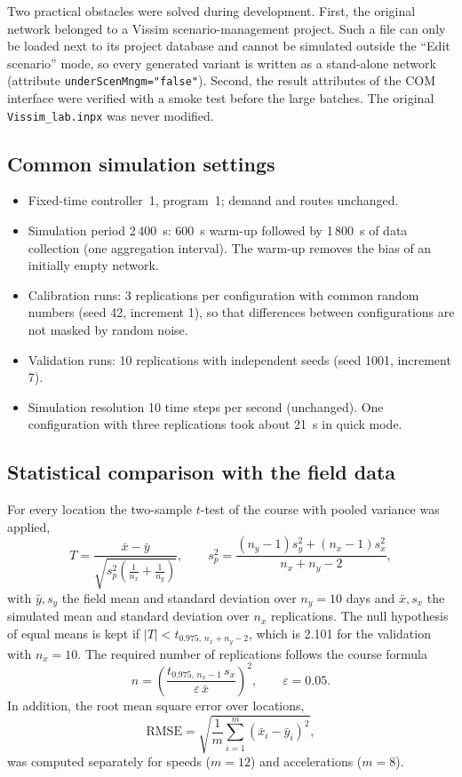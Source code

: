\documentclass[11pt,a4paper]{article}
\newcommand{\RMSE}{\mathrm{RMSE}}
\newcommand{\code}[1]{\texttt{#1}}
\begin{document}
Two practical obstacles were solved during development. First, the original network belonged to a
Vissim scenario-management project. Such a file can only be loaded next to its project database
and cannot be simulated outside the ``Edit scenario'' mode, so every generated variant is written
as a stand-alone network (attribute \code{underScenMngm="false"}). Second, the result attributes
of the COM interface were verified with a smoke test before the large batches. The original
\code{Vissim\_lab.inpx} was never modified.

\subsection{Common simulation settings}

\begin{itemize}
  \item Fixed-time controller~1, program~1; demand and routes unchanged.
  \item Simulation period 2\,400~s: 600~s warm-up followed by 1\,800~s of data collection (one
        aggregation interval). The warm-up removes the bias of an initially empty network.
  \item Calibration runs: 3 replications per configuration with common random numbers (seed 42,
        increment 1), so that differences between configurations are not masked by random noise.
  \item Validation runs: 10 replications with independent seeds (seed 1001, increment 7).
  \item Simulation resolution 10 time steps per second (unchanged). One configuration with three
        replications took about 21~s in quick mode.
\end{itemize}

\subsection{Statistical comparison with the field data}

For every location the two-sample $t$-test of the course with pooled variance was applied,
\begin{equation}
T = \frac{\bar x - \bar y}{\sqrt{s_p^2\left(\frac{1}{n_x}+\frac{1}{n_y}\right)}},\qquad
s_p^2 = \frac{(n_y-1)s_y^2 + (n_x-1)s_x^2}{n_x+n_y-2},
\label{eq:ttest}
\end{equation}
with $\bar y, s_y$ the field mean and standard deviation over $n_y = 10$ days and $\bar x, s_x$
the simulated mean and standard deviation over $n_x$ replications. The null hypothesis of equal
means is kept if $|T| < t_{0.975,\,n_x+n_y-2}$, which is 2.101 for the validation with $n_x = 10$.
The required number of replications follows the course formula
\begin{equation}
n = \left(\frac{t_{0.975,\,n_x-1}\, s_x}{\varepsilon\, \bar x}\right)^2, \qquad \varepsilon = 0.05 .
\label{eq:nrep}
\end{equation}
In addition, the root mean square error over locations,
\begin{equation}
\RMSE = \sqrt{\frac{1}{m}\sum_{i=1}^{m} (\bar x_i-\bar y_i)^2},
\end{equation}
was computed separately for speeds ($m=12$) and accelerations ($m=8$).
\end{document}
